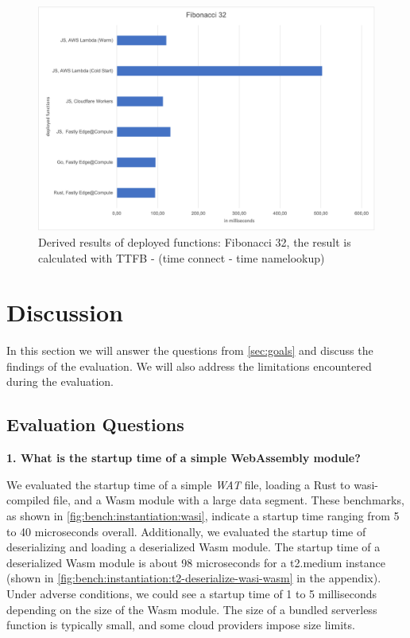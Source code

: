 \begin{figure}[htbp]
    \centering
        \includegraphics[width=0.95\linewidth]{images/benches/deployed_functions_fib32.png}
    \caption{Derived results of deployed functions: Fibonacci 32, the result is calculated with TTFB - (time connect - time namelookup)}
    \label{fig:eval:deployed-functions}
\end{figure}

\section{Discussion}
\label{sec:discussion}

In this section we will answer the questions from \autoref{sec:goals} and discuss the findings of the evaluation. We will also address the limitations encountered during the evaluation.

\subsection{Evaluation Questions}

\textbf{1. What is the startup time of a simple \gls{WebAssembly} module?}

We evaluated the startup time of a simple \textit{WAT} file, loading a Rust to \gls{wasi}-compiled file, and a Wasm module with a large data segment. These benchmarks, as shown in \autoref{fig:bench:instantiation:wasi}, indicate a startup time ranging from 5 to 40 microseconds overall. Additionally, we evaluated the startup time of deserializing and loading a deserialized Wasm module. The startup time of a deserialized Wasm module is about 98 microseconds for a t2.medium instance (shown in \autoref{fig:bench:instantiation:t2-deserialize-wasi-wasm} in the appendix). Under adverse conditions, we could see a startup time of 1 to 5 milliseconds depending on the size of the Wasm module. The size of a bundled serverless function is typically small, and some cloud providers impose size limits.

